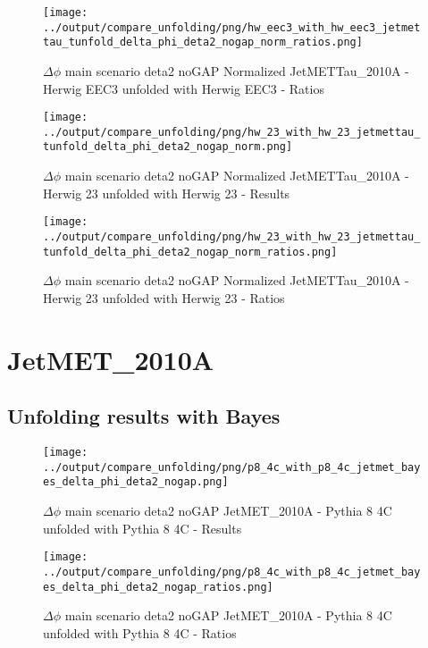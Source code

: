 \documentclass[11pt]{book}
\begin{document}
\begin{figure}[ht]
\centering
\texttt{[image: ../output/compare\_unfolding/png/hw\_eec3\_with\_hw\_eec3\_jetmettau\_tunfold\_delta\_phi\_deta2\_nogap\_norm\_ratios.png]}
\caption{$\Delta\phi$ main scenario deta2 noGAP Normalized JetMETTau\_2010A - Herwig EEC3 unfolded with Herwig EEC3 - Ratios}
\label{hw_eec3_hw_eec3_jetmettau_tunfold_delta_phi_deta2_nogap_norm_b}
\end{figure}

\begin{figure}[ht]
\centering
\texttt{[image: ../output/compare\_unfolding/png/hw\_23\_with\_hw\_23\_jetmettau\_tunfold\_delta\_phi\_deta2\_nogap\_norm.png]}
\caption{$\Delta\phi$ main scenario deta2 noGAP Normalized JetMETTau\_2010A - Herwig 23 unfolded with Herwig 23 - Results}
\label{hw_23_hw_23_jetmettau_tunfold_delta_phi_deta2_nogap_norm_a}
\end{figure}

\begin{figure}[ht]
\centering
\texttt{[image: ../output/compare\_unfolding/png/hw\_23\_with\_hw\_23\_jetmettau\_tunfold\_delta\_phi\_deta2\_nogap\_norm\_ratios.png]}
\caption{$\Delta\phi$ main scenario deta2 noGAP Normalized JetMETTau\_2010A - Herwig 23 unfolded with Herwig 23 - Ratios}
\label{hw_23_hw_23_jetmettau_tunfold_delta_phi_deta2_nogap_norm_b}
\end{figure}


\clearpage
\section{JetMET\_2010A}
\subsection{Unfolding results with Bayes}

\begin{figure}[ht]
\centering
\texttt{[image: ../output/compare\_unfolding/png/p8\_4c\_with\_p8\_4c\_jetmet\_bayes\_delta\_phi\_deta2\_nogap.png]}
\caption{$\Delta\phi$ main scenario deta2 noGAP JetMET\_2010A - Pythia 8 4C unfolded with Pythia 8 4C - Results}
\label{p8_p8_jetmet_bayes_delta_phi_deta2_nogap_a}
\end{figure}

\begin{figure}[ht]
\centering
\texttt{[image: ../output/compare\_unfolding/png/p8\_4c\_with\_p8\_4c\_jetmet\_bayes\_delta\_phi\_deta2\_nogap\_ratios.png]}
\caption{$\Delta\phi$ main scenario deta2 noGAP JetMET\_2010A - Pythia 8 4C unfolded with Pythia 8 4C - Ratios}
\label{p8_p8_jetmet_bayes_delta_phi_deta2_nogap_b}
\end{figure}
\end{document}
